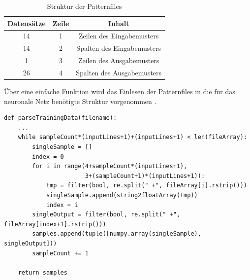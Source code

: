 \begin{table}[h!]
	\centering	
\begin{tabular}{c|c|c}

\textbf{Datensätze} & \textbf{Zeile} & \textbf{Inhalt} \\ 
\hline 
14 & 1 & Zeilen des Eingabemusters \\ 
\hline 
14 & 2 & Spalten des Eingabemusters \\ 
\hline 
1 & 3 & Zeilen des Ausgabemusters \\ 
\hline 
26 & 4 & Spalten des Ausgabemusters \\ 

\end{tabular} 
	\caption{Struktur der Patternfiles}
	\label{pattern}
\end{table}

Über eine einfache Funktion wird das Einlesen der Patternfiles in die für das neuronale Netz benötigte Struktur vorgenommen . 
\begin{lstlisting}[caption={Parsen der Patternfiles},label={parse}]
def parseTrainingData(filename):
    ...
    while sampleCount*(inputLines+1)+(inputLines+1) < len(fileArray):
        singleSample = []
        index = 0
        for i in range(4+sampleCount*(inputLines+1), 
                       3+(sampleCount+1)*(inputLines+1)):
            tmp = filter(bool, re.split(" +", fileArray[i].rstrip()))
            singleSample.append(string2floatArray(tmp))
            index = i
        singleOutput = filter(bool, re.split(" +", fileArray[index+1].rstrip()))
        samples.append(tuple([numpy.array(singleSample), singleOutput]))
        sampleCount += 1
        
    return samples
\end{lstlisting}
